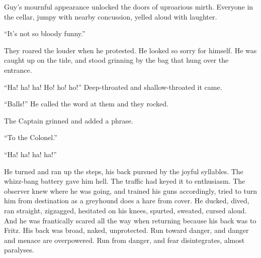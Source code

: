 Guy's mournful appearance unlocked the doors of uproarious mirth. Everyone in the cellar, jumpy with nearby concussion, yelled aloud with laughter.

``It's not so bloody funny.''

They roared the louder when he protested. He looked so sorry for himself. He was caught up on the tide, and stood grinning by the bag that hung over the entrance.

``Ha! ha! ha! Ho! ho! ho!'' Deep-throated and shallow-throated it came.

``Balls!'' He called the word at them and they rocked.

The Captain grinned and added a phrase.

``To the Colonel.''

``Ha! ha! ha! ha!''

He turned and ran up the steps, his back pursued by the joyful syllables. The whizz-bang battery gave him hell. The traffic had keyed it to enthusiasm. The observer knew where he was going, and trained his guns accordingly, tried to turn him from destination as a greyhound does a hare from cover. He ducked, dived, ran straight, zigzagged, hesitated on his knees, spurted, sweated, cursed aloud. And he was frantically scared all the way when returning because his back was to Fritz. His back was broad, naked, unprotected. Run toward danger, and danger and menace are overpowered. Run from danger, and fear disintegrates, almost paralyses.
